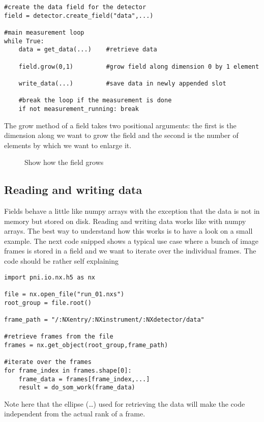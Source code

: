 \begin{verbatim}
#create the data field for the detector
field = detector.create_field("data",...)

#main measurement loop
while True:
    data = get_data(...)    #retrieve data

    field.grow(0,1)         #grow field along dimension 0 by 1 element
   
    write_data(...)         #save data in newly appended slot
   
    #break the loop if the measurement is done
    if not measurement_running: break

\end{verbatim}
The grow method of a field takes two positional arguments: the first is the 
dimension along we want to grow the field and the second is the number of 
elements by which we want to enlarge it.

\begin{figure}
    \centering
    \begin{minipage}[c]{0.7\linewidth}
    \end{minipage}
    \hfill
    \begin{minipage}[c]{0.29\linewidth}
    \label{fig:field_grow}
    \caption{{\small Show how the field grows}}
    \end{minipage}
\end{figure}

\subsection{Reading and writing data}

Fields behave a little like numpy arrays with the exception that the data is not
in memory but stored on disk. Reading and writing data works like with numpy
arrays. The best way to understand how this works is to have a look on a small
example. 
The next code snipped shows a typical use case where a bunch of image frames is
stored in a field and we want to iterate over the individual frames. 
The code should be rather self explaining
\begin{verbatim}
import pni.io.nx.h5 as nx

file = nx.open_file("run_01.nxs")
root_group = file.root()

frame_path = "/:NXentry/:NXinstrument/:NXdetector/data"

#retrieve frames from the file
frames = nx.get_object(root_group,frame_path)

#iterate over the frames
for frame_index in frames.shape[0]:
    frame_data = frames[frame_index,...]
    result = do_som_work(frame_data)
\end{verbatim}
Note here that the ellipse (\dots) used for retrieving the data will make 
the code independent from the actual rank of a frame.

